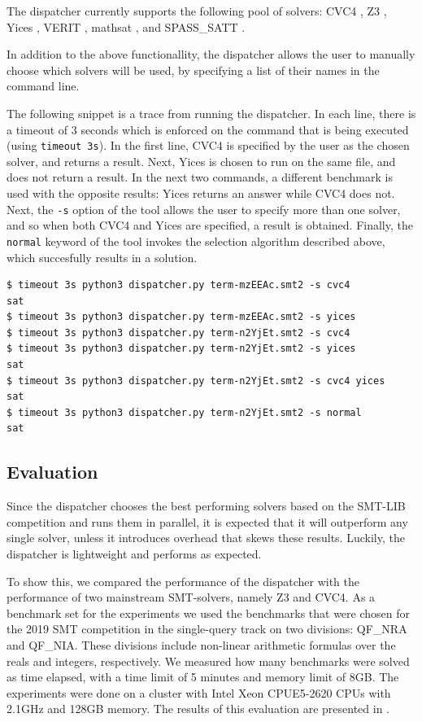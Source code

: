 \documentclass{article}
\begin{document}
The dispatcher currently supports the following pool of solvers:
CVC4 \cite{CVC4},
Z3 \cite{Z3},
Yices \cite{Dutertre:cav2014},
VERIT \cite{10.1007/978-3-642-02959-2_12},
mathsat \cite{mathsat5},
and
SPASS\_SATT \cite{10.1007/978-3-030-29436-6_7}.


In addition to the above functionallity, the dispatcher allows the user to manually choose
which solvers will be used, by specifying a list of their names in the command line.

The following snippet is a trace from running the dispatcher.
In each line, there is a timeout of 3 seconds which is enforced on the command that
is being executed (using \verb!timeout 3s!).
In the first line, CVC4 is specified by the user as the chosen solver, 
and returns a result.
Next, Yices is chosen to run on the same file, and does not return a result.
In the next two commands, a different benchmark is used with the opposite results:
Yices returns an answer while CVC4 does not.
Next, the \verb!-s! option of the tool allows the user to specify more than one solver,
and so when both CVC4 and Yices are specified, a result is obtained.
Finally, the \verb!normal! keyword of the tool invokes the selection algorithm
described above, which succesfully results in a solution.

\begin{center}
\begin{verbatim}
$ timeout 3s python3 dispatcher.py term-mzEEAc.smt2 -s cvc4
sat
$ timeout 3s python3 dispatcher.py term-mzEEAc.smt2 -s yices
$ timeout 3s python3 dispatcher.py term-n2YjEt.smt2 -s cvc4
$ timeout 3s python3 dispatcher.py term-n2YjEt.smt2 -s yices
sat
$ timeout 3s python3 dispatcher.py term-n2YjEt.smt2 -s cvc4 yices
sat
$ timeout 3s python3 dispatcher.py term-n2YjEt.smt2 -s normal
sat
\end{verbatim}
\end{center}

\subsection{Evaluation}

Since the dispatcher chooses the best performing solvers based on
the SMT-LIB competition
and runs them in parallel,
it is expected that it will outperform any single solver,
unless it introduces overhead that skews these results.
Luckily, the dispatcher is lightweight and performs
as expected.

To show this, we compared the performance of the dispatcher
with the performance of two mainstream SMT-solvers,
namely Z3 and CVC4.
As a benchmark set for the experiments we used the benchmarks that were chosen for the 2019 SMT competition in the single-query track on two divisions:
QF\_NRA and QF\_NIA.
These divisions include non-linear arithmetic formulas
over the reals and integers, respectively.
We measured how many benchmarks were solved as time
elapsed, with
a time limit of 5 minutes and memory limit of 8GB.
%
The experiments were done on
a cluster with Intel Xeon CPUE5-2620 CPUs with 2.1GHz and 128GB memory.
The results of this evaluation are presented in
.
\end{document}

